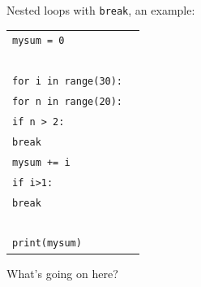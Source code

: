 \documentclass[t,handout,9pt]{beamer}
\begin{document}
%
\begin{frame}
\vfill
Nested loops with \texttt{break}, an example:
\begin{table}[]
\begin{flushleft}
\begin{tabular}{ll}
\texttt{mysum = 0} &  \\
\texttt{ } &  \\
\texttt{for i in range(30):} &  \\
\texttt{\qquad for n in range(20):} &  \\
\texttt{\qquad\qquad if n > 2:}        & \\
\texttt{\qquad\qquad\qquad break}        & \\
\texttt{\qquad\qquad mysum += i} &  \\
\texttt{\qquad if i>1:} &  \\
\texttt{\qquad\qquad break} &  \\
\texttt{ } &  \\
\texttt{print(mysum)} &  \\
\end{tabular}
\end{flushleft}
\end{table}
\vfill
What's going on here?
\vfill
\end{frame}
\end{document}
